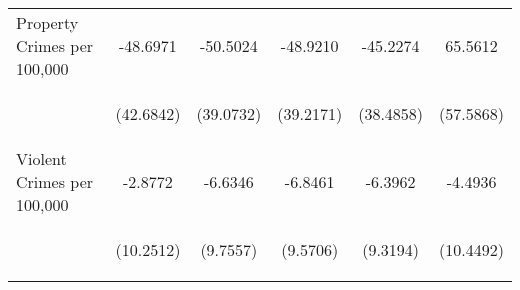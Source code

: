 \begin{center}
\begin{tabular}{lccccc}
\noalign{\smallskip}Property Crimes per 100,000 & \begin{scriptsize}-48.6971\end{scriptsize} & \begin{scriptsize}-50.5024\end{scriptsize} & \begin{scriptsize}-48.9210\end{scriptsize} & \begin{scriptsize}-45.2274\end{scriptsize} & \begin{scriptsize}65.5612\end{scriptsize}\\
 & \begin{scriptsize}(42.6842)\end{scriptsize} & \begin{scriptsize}(39.0732)\end{scriptsize} & \begin{scriptsize}(39.2171)\end{scriptsize} & \begin{scriptsize}(38.4858)\end{scriptsize} & \begin{scriptsize}(57.5868)\end{scriptsize}\\
\noalign{\smallskip}Violent Crimes per 100,000 & \begin{scriptsize}-2.8772\end{scriptsize} & \begin{scriptsize}-6.6346\end{scriptsize} & \begin{scriptsize}-6.8461\end{scriptsize} & \begin{scriptsize}-6.3962\end{scriptsize} & \begin{scriptsize}-4.4936\end{scriptsize}\\
 & \begin{scriptsize}(10.2512)\end{scriptsize} & \begin{scriptsize}(9.7557)\end{scriptsize} & \begin{scriptsize}(9.5706)\end{scriptsize} & \begin{scriptsize}(9.3194)\end{scriptsize} & \begin{scriptsize}(10.4492)\end{scriptsize}\\

\end{tabular}
\end{center}
